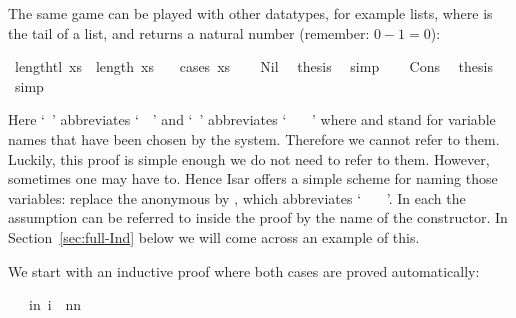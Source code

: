 \begin{isabellebody}
\begin{isamarkuptext}
The same game can be played with other datatypes, for example lists,
where  is the tail of a list, and  returns a
natural number (remember: $0-1=0$):%
\end{isamarkuptext}%
\isamarkuptrue%
\isamarkupfalse%
\ {\isachardoublequote}length{\isacharparenleft}tl\ xs{\isacharparenright}\ {\isacharequal}\ length\ xs\ {\isacharminus}\ {}{\isachardoublequote}\isanewline
\isamarkupfalse%
\ {\isacharparenleft}cases\ xs{\isacharparenright}\isanewline
\ \ \isamarkupfalse%
\ Nil\ \isamarkupfalse%
\ {\isacharquery}thesis\ \isamarkupfalse%
\ simp\isanewline
\isamarkupfalse%
\isanewline
\ \ \isamarkupfalse%
\ Cons\ \isamarkupfalse%
\ {\isacharquery}thesis\ \isamarkupfalse%
\ simp\isanewline
\isamarkupfalse%
\isamarkupfalse%
%
\begin{isamarkuptext}%
\noindent Here `~' abbreviates
`~~' and
`~'
abbreviates `~\isa{{\isacharquery}\ {\isacharquery}{\isacharquery}}
~~'
where \isa{{\isacharquery}} and \isa{{\isacharquery}{\isacharquery}}
stand for variable names that have been chosen by the system.
Therefore we cannot refer to them.
Luckily, this proof is simple enough we do not need to refer to them.
However, sometimes one may have to. Hence Isar offers a simple scheme for
naming those variables: replace the anonymous  by
, which abbreviates `~
~~'.
In each  the assumption can be
referred to inside the proof by the name of the constructor. In
Section~\ref{sec:full-Ind} below we will come across an example
of this.%
\end{isamarkuptext}%
\isamarkuptrue%
%
\isamarkuptrue%
%
\begin{isamarkuptext}%
We start with an inductive proof where both cases are proved automatically:%
\end{isamarkuptext}%
\isamarkuptrue%
\ {\isachardoublequote}{}\ {\isacharasterisk}\ {\isacharparenleft}{\isasymSum}i{\isacharless}n{\isacharplus}{}{\isachardot}\ i{\isacharparenright}\ {\isacharequal}\ n{\isacharasterisk}{\isacharparenleft}n{\isacharplus}{}{\isacharparenright}{\isachardoublequote}\isanewline

\end{isabellebody}
